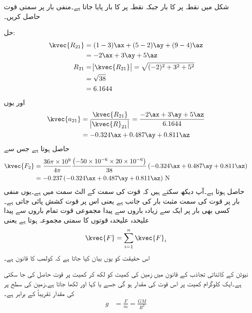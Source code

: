 شکل  میں نقطہ  پر  کا بار  جبکہ نقطہ  پر  کا بار  پایا جاتا ہے۔منفی بار  پر سمتی قوت حاصل کریں۔

حل:
\begin{align*}
\kvec{R_{21}}&=(1-3) \ax+(5-2) \ay+(9-4)\az\\
&=-2 \ax+3 \ay+5 \az\\
R_{21}&=\abs{\kvec{R_{21}}}=\sqrt{(-2)^2+3^2+5^2}\\
&=\sqrt{38}\\
&=6.1644
\end{align*}
اور یوں
\begin{align*}
\kvec{a_{21}}&=\frac{{\kvec{R_{21}}}}{\abs{\kvec{R}_{21}}}=\frac{-2 {\ax}+3 {\ay}+5 \az}{6.1644}\\
&=-0.324 \ax+0.487 \ay+0.811\az
\end{align*}
حاصل ہوتا ہے جس سے
\begin{align*}
\kvec{F_2}&=\frac{36 \pi  \times 10^9}{4 \pi} \frac{\left (-50\times 10^{-6} \times 20 \times 10^{-6} \right )}{38} \left(-0.324 \ax+0.487 \ay+0.811\az\right)\\
&=-0.237  \left(-0.324 \ax+0.487 \ay+0.811\az \right) \, \si{\newton}
\end{align*}
حاصل ہوتا ہے۔آپ دیکھ سکتے ہیں کہ قوت کی سمت  کے الٹ سمت میں ہے۔یوں منفی بار پر قوت کی سمت مثبت بار کی جانب ہے یعنی اس پر قوت کشش پائی جاتی ہے۔
کسی بھی بار پر ایک سے زیادہ باروں سے پیدا مجموعی قوت تمام باروں سے پیدا علیحدہ علیحدہ قوتوں کا سمتی مجموعہ ہوتا ہے یعنی
\begin{align}
\kvec{F}=\sum_{i=1}^n \kvec{F}_i
\end{align}
اس حقیقت کو یوں بیان کیا جاتا ہے کہ کولمب کا قانون  ہے۔ 

نیوٹن کے کائناتی تجاذب کے قانون میں زمین کی کمیت کو  لکھ کر کمیت  پر قوت  حاصل کی جا سکتی ہے۔ایک کلوگرام کمیت پر اس قوت کی مقدار  ہو گی جسے  یا  کہا اور  لکھا جاتا ہے۔زمین کی سطح پر  کی مقدار تقریباً  کے برابر ہے۔
\begin{align}\label{مساوات_کولمب_زمین_کی_کشش}
g&=\frac{F}{m}=\frac{GM}{R^2}
\end{align}

